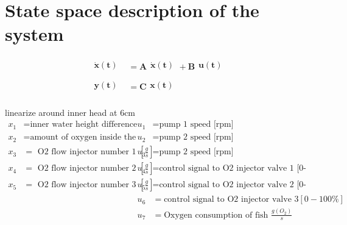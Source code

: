 \documentclass{article}
\begin{document}
\section{State space description of the system}

\begin{align}
    \begin{matrix}
    \mathbf{\dot{x}(t)}\\    
    \end{matrix}
    &=
    \mathbf{A}
    \begin{matrix}
        \mathbf{\dot{x}(t)}\\    
    \end{matrix}
    +
    \mathbf{B}
    \begin{matrix}
        \mathbf{u(t)}\\    
    \end{matrix} \\
    \begin{matrix}
        \mathbf{y(t)}\\    
    \end{matrix}
     &=
    \mathbf{C}
    \begin{matrix}
        \mathbf{x(t)}\\    
    \end{matrix}
\end{align}

linearize around inner head at 6cm
\begin{align*}
    x_1 &= \text{inner water height difference}                         & u_1&= \text{pump 1 speed [rpm]}\\
    x_2 &= \text{amount of oxygen inside the pen}                       & u_2&= \text{pump 2 speed [rpm]}\\
    x_3 &= \text{ O2 flow injector number 1 }\left[\frac{g}{s}\right]                   & u_3&= \text{pump 2 speed [rpm]}\\
    x_4 &= \text{ O2 flow injector number 2 }\left[\frac{g}{s}\right]                   & u_4&= \text{control signal to O2 injector valve 1 [0-100\%]}\\
    x_5 &= \text{ O2 flow injector number 3 }\left[\frac{g}{s}\right]                   & u_5&= \text{control signal to O2 injector valve 2 [0-100\%]}\\
        &                                                               & u_6&= \text{control signal to O2 injector valve 3} [0-100\%]\\
        &                                                               & u_7&= \text{Oxygen consumption of fish }\frac{g(O_2)}{s}
\end{align*}
\end{document}
